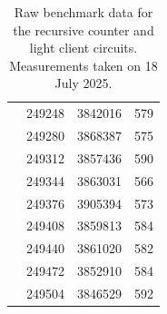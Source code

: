\documentclass[runningheads]{llncs}
\begin{document}
\begin{table}[H]
\begin{tabular}{lr@{\hspace{2em}} S[table-format=6] @{\hspace{1em}} S[table-format=7,group-separator={,}] @{\hspace{1em}} S[table-format=3]}
     & 249248 & 3842016 & 579 \\
     & 249280 & 3868387 & 575 \\
     & 249312 & 3857436 & 590 \\
     & 249344 & 3863031 & 566 \\
     & 249376 & 3905394 & 573 \\
     & 249408 & 3859813 & 584 \\
     & 249440 & 3861020 & 582 \\
     & 249472 & 3852910 & 584 \\
     & 249504 & 3846529 & 592 \\
    \bottomrule
  \end{tabular}
  \caption{Raw benchmark data for the recursive counter and light client circuits. Measurements taken on 18 July 2025.}
  \label{tab:raw_benchmark_data}
\end{table}

%


\end{document}
